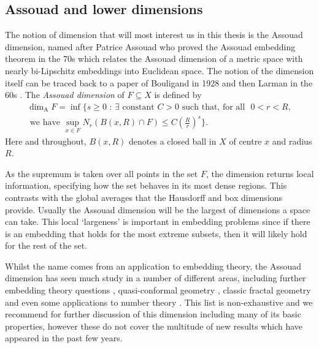 \subsection{Assouad and lower dimensions}
\label{sec:intro-ass}

The notion of dimension that will most interest us in this thesis is the Assouad dimension, named after Patrice Assouad who proved the Assouad embedding theorem in the 70s \cite{assouad1, assouad2} which relates the Assouad dimension of a metric space with nearly bi-Lipschitz embeddings into Euclidean space. The notion of the dimension itself can be traced back to a paper of Bouligand in 1928 \cite{bouligand} and then Larman in the 60s \cite{larman1,larman2}. The \textit{Assouad dimension} of $F \subseteq X$ is defined by 
\begin{multline*}
\dim_{\text{A}} F = \inf \Bigg\{ s \geq 0 \, \,  : \, \exists \text{ constant } C > 0 \text{ such that, for all } \, \, 0< r< R,\\ \text{ we have  }\sup_{x\in F} N_r (B(x,R)\cap F) \leq C\left(\frac{R}{r}\right)^{s} \Bigg\}.
\end{multline*}
Here and throughout, $B(x,R)$ denotes a closed ball in $X$ of centre $x$ and radius $R$.

As the supremum is taken over all points in the set $F$, the dimension returns local information, specifying how the set behaves in its most dense regions. This contrasts with the global averages that the Hausdorff and box dimensions provide. Usually the Assouad dimension will be the largest of dimensions a space can take. This local `largeness' is important in embedding problems since if there is an embedding that holds for the most extreme subsets, then it will likely hold for the rest of the set. 

Whilst the name comes from an application to embedding theory, the Assouad dimension has seen much study in a number of different areas, including further embedding theory questions \cite{olson02, olson10, robinson}, quasi-conformal geometry \cite{heinonen, tyson, mackaytyson}, classic fractal geometry \cite{fraser-kaenmaki-proj, fraser-todd, tros, orponen, ldr} and even some applications to number theory \cite{FY, fraser-saito-yu}. This list is non-exhaustive and we recommend \cite{robinson, Fr} for further discussion of this dimension including many of its basic properties, however these do not cover the multitude of new results which have appeared in the past few years. 

